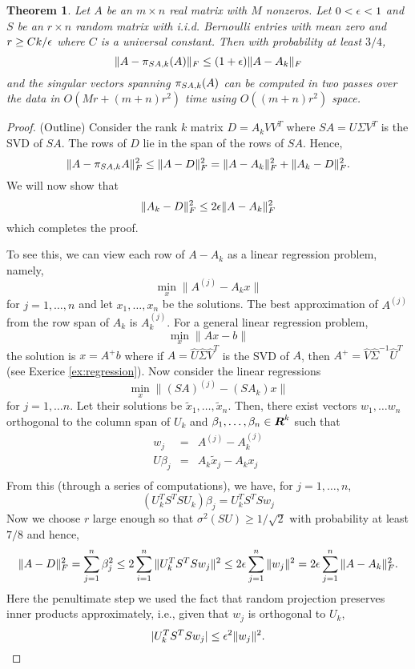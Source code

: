 \documentclass{book}
\newtheorem{theorem}{Theorem}[chapter]
\numberwithin{exercise}{chapter}
\begin{document}
\begin{theorem}\label{thm:isoRP}
Let $A$ be an $m \times n$ real matrix with $M$ nonzeros. Let $0 < \epsilon < 1$ and $S$ be an $r \times n$
random matrix with i.i.d. Bernoulli entries with mean zero and $r \ge Ck/\epsilon$ where $C$ is a universal constant.
Then with probability at least $3/4$,
\[
\|A - \pi_{SA,k}(A)\|_F \le (1 + \epsilon) \|A - A_k\|_F
\]
and the singular vectors spanning $\pi_{SA,k}(A)$ can be computed in two passes over the data
in $O(Mr+(m+n)r^2)$ time using $O((m + n)r^2)$ space.
\end{theorem}

\begin{proof}(Outline)
Consider the rank $k$ matrix $D = A_kVV^T$ where $SA = U \Sigma V^T$ is the SVD of $SA$. The rows of $D$ lie in the span of the rows of $SA$.
Hence,
\[
\|A - \pi_{SA, k} A\|_F^2 \le \|A-D\|_F^2 = \|A-A_k\|_F^2 + \|A_k - D\|_F^2.
\]
We will now show that
\[
\|A_k -D\|_F^2 \le 2\epsilon \|A-A_k\|_F^2
\]
which completes the proof.

To see this, we can view each row of $A-A_k$ as a linear regression problem, namely,
\[
\min_{x} \|A^{(j)} - A_kx\|
\]
for $j=1,\ldots,n$ and let $x_1, \ldots, x_n$ be the solutions. The best approximation of $A^{(j)}$ from the row span of $A_k$ is $A_k^{(j)}$.
For a general linear regression problem,
\[
\min_x \| Ax -b \|
\]
the solution is $x = A^+ b$ where if $A = \hat{U}\hat{\Sigma}\hat{V}^T$ is the SVD of $A$, then $A^+ = \hat{V}\hat{\Sigma}^{-1}\hat{U}^T$
(see Exerice \ref{ex:regression}).
Now consider the linear regressions
\[
\min_x \|(SA)^{(j)} - (SA_k)x\|
\]
for $j=1,\ldots n$. Let their solutions be $\tilde{x}_1, \ldots, \tilde{x}_n$.
Then, there exist vectors $w_1, \ldots w_n$ orthogonal to the column span of $U_k$ and $\beta_1, \ldots, \beta_n \in \mbox{\mbox{\boldmath $R$}}^k$ such that
\begin{eqnarray*}
w_j &=& A^{(j)} - A_k^{(j)} \\
U\beta_j &=& A_k\tilde{x}_j - A_kx_j\\
\end{eqnarray*}
From this (through a series of computations), we have, for $j=1,\ldots, n$,
\[
(U_k^TS^TSU_k)\beta_j = U_k^TS^TSw_j
\]
Now we choose $r$ large enough so that $\sigma^2(SU) \ge 1/\sqrt{2}$ with probability at least $7/8$ and hence,
\[
\|A-D\|_F^2 = \sum_{j=1}^n \beta_j^2 \le 2\sum_{i=1}^n \|U_k^TS^TSw_j\|^2 \le 2\epsilon\sum_{j=1}^n\|w_j\|^2 = 2\epsilon\sum_{j=1}^n \|A-A_k\|_F^2.
\]
Here the penultimate step we used the fact that random projection preserves inner products approximately, i.e., given that
$w_j$ is orthogonal to $U_k$,
\[
|U_k^TS^TSw_j| \le \epsilon^2\|w_j\|^2.
\]
\end{proof}
\end{document}
